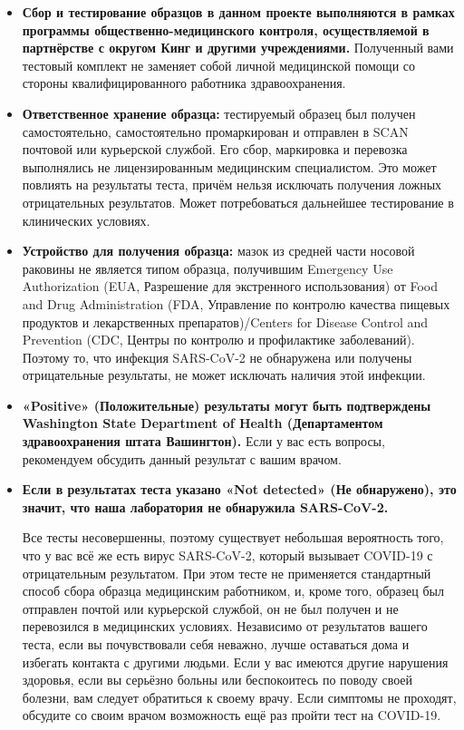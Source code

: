 \documentclass[10pt]{article}
\begin{document}
\begin{itemize}
\item

  \textbf{Сбор и тестирование образцов в данном проекте выполняются в рамках
  программы общественно-медицинского контроля, осуществляемой в партнёрстве с
  округом Кинг и другими учреждениями.} Полученный вами тестовый комплект не
  заменяет собой личной медицинской помощи со стороны квалифицированного
  работника здравоохранения.

\item

  \textbf{Ответственное хранение образца:} тестируемый образец был получен
  самостоятельно, самостоятельно промаркирован и отправлен в SCAN почтовой или
  курьерской службой. Его сбор, маркировка и перевозка выполнялись не
  лицензированным медицинским специалистом. Это может повлиять на результаты
  теста, причём нельзя исключать получения ложных отрицательных результатов.
  Может потребоваться дальнейшее тестирование в клинических условиях.

\item

  \textbf{Устройство для получения образца:} мазок из средней части носовой
  раковины не является типом образца, получившим Emergency Use Authorization
  (EUA, Разрешение для экстренного использования) от Food and Drug
  Administration (FDA, Управление по контролю качества пищевых продуктов и
  лекарственных препаратов)/Centers for Disease Control and Prevention (CDC,
  Центры по контролю и профилактике заболеваний). Поэтому то, что инфекция
  SARS-CoV-2 не обнаружена или получены отрицательные результаты, не может
  исключать наличия этой инфекции.

\item

  \textbf{«Positive» (Положительные) результаты могут быть подтверждены
  Washington State Department of Health (Департаментом здравоохранения штата
  Вашингтон).} Если у вас есть вопросы, рекомендуем обсудить данный результат с
  вашим врачом.

\item{
  \textbf{Если в результатах теста указано «Not detected» (Не обнаружено), это
  значит, что наша лаборатория не обнаружила SARS-CoV-2.}

  Все тесты несовершенны, поэтому существует небольшая вероятность того, что у
  вас всё же есть вирус SARS-CoV-2, который вызывает COVID-19 с отрицательным
  результатом.  При этом тесте не применяется стандартный способ сбора образца
  медицинским работником, и, кроме того, образец был отправлен почтой или
  курьерской службой, он не был получен и не перевозился в медицинских условиях.
  Независимо от результатов вашего теста, если вы почувствовали себя неважно,
  лучше оставаться дома и избегать контакта с другими людьми. Если у вас имеются
  другие нарушения здоровья, если вы серьёзно больны или беспокоитесь по поводу
  своей болезни, вам следует обратиться к своему врачу.  Если симптомы не
  проходят, обсудите со своим врачом возможность ещё раз пройти тест на
  COVID-19.
}


\end{itemize}
\end{document}
